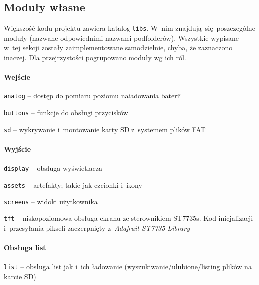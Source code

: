 \documentclass[polish]{aghengthesis}
\let\tempone\itemize
\let\temptwo\enditemize
\renewenvironment{itemize}{\tempone\setlength{\itemsep}{0cm}}{\temptwo}
\begin{document}
		\subsection{Moduły własne}
			Większość kodu projektu zawiera katalog \lstinline|libs|. W~nim znajdują się poszczególne moduły (nazwane odpowiednimi nazwami podfolderów). Wszystkie wypisane w~tej sekcji zostały zaimplementowane samodzielnie, chyba, że zaznaczono inaczej. Dla przejrzystości pogrupowano moduły wg ich ról.
		
			\paragraph{Wejście}
				\begin{itemize}
					\item \lstinline|analog| -- dostęp do pomiaru poziomu naładowania baterii
					\item \lstinline|buttons| -- funkcje do obsługi przycisków
					\item \lstinline|sd| -- wykrywanie i~montowanie karty SD z~systemem plików FAT
				\end{itemize}
			\pagebreak
			
			\paragraph{Wyjście}
				\begin{itemize}
					\item \lstinline|display| -- obsługa wyświetlacza
					\begin{itemize}
						\item \lstinline|assets| -- artefakty; takie jak czcionki i~ikony
						\item \lstinline|screens| -- widoki użytkownika
						\item \lstinline|tft| -- niskopoziomowa obsługa ekranu ze sterownikiem ST7735s. Kod inicjalizacji i~przesyłania pikseli zaczerpnięty z~\textit{Adafruit-ST7735-Library}\textsuperscript{\cite{adafruit_st7735}}
					\end{itemize}
				\end{itemize}
			
			\paragraph{Obsługa list}
				\begin{itemize}
					\item \lstinline|list| -- obsługa list jak i~ich ładowanie (wyszukiwanie/ulubione/listing plików na karcie SD)
				\end{itemize}
			
\end{document}
